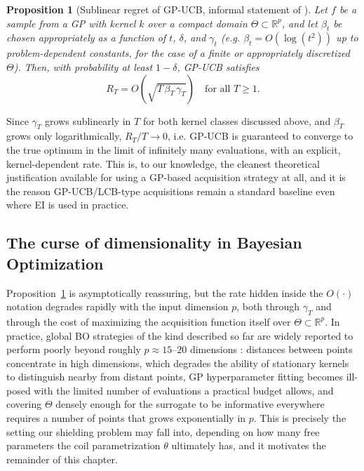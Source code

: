 \documentclass{article}
\newtheorem{prop}{Proposition}
\begin{document}
	\begin{prop}[Sublinear regret of GP-UCB, informal statement of \cite{Srinivas2010}] \label{prop:gpucb_regret}
		Let $f$ be a sample from a GP with kernel $k$ over a compact domain $\Theta \subset \mathbb{R}^p$, and let $\beta_t$ be chosen appropriately as a function of $t$, $\delta$, and $\gamma_t$ (e.g. $\beta_t = O(\log(t^2))$ up to problem-dependent constants, for the case of a finite or appropriately discretized $\Theta$). Then, with probability at least $1 - \delta$, GP-UCB satisfies
		\begin{equation}
			R_T = O\!\left(\sqrt{T \, \beta_T \, \gamma_T}\right) \quad \text{for all } T \ge 1.
		\end{equation}
	\end{prop}
	
	Since $\gamma_T$ grows sublinearly in $T$ for both kernel classes discussed above, and $\beta_T$ grows only logarithmically, $R_T / T \to 0$, i.e. GP-UCB is guaranteed to converge to the true optimum in the limit of infinitely many evaluations, with an explicit, kernel-dependent rate. This is, to our knowledge, the cleanest theoretical justification available for using a GP-based acquisition strategy at all, and it is the reason GP-UCB/LCB-type acquisitions remain a standard baseline even where EI is used in practice.
	
	\subsection{The curse of dimensionality in Bayesian Optimization}
	
	Proposition~\ref{prop:gpucb_regret} is asymptotically reassuring, but the rate hidden inside the $O(\cdot)$ notation degrades rapidly with the input dimension $p$, both through $\gamma_T$ and through the cost of maximizing the acquisition function itself over $\Theta \subset \mathbb{R}^p$. In practice, global BO strategies of the kind described so far are widely reported to perform poorly beyond roughly $p \approx 15$–$20$ dimensions \cite{garnett_bayesoptbook_2023}: distances between points concentrate in high dimensions, which degrades the ability of stationary kernels to distinguish nearby from distant points, GP hyperparameter fitting becomes ill-posed with the limited number of evaluations a practical budget allows, and covering $\Theta$ densely enough for the surrogate to be informative everywhere requires a number of points that grows exponentially in $p$. This is precisely the setting our shielding problem may fall into, depending on how many free parameters the coil parametrization $\theta$ ultimately has, and it motivates the remainder of this chapter.
	
\end{document}
